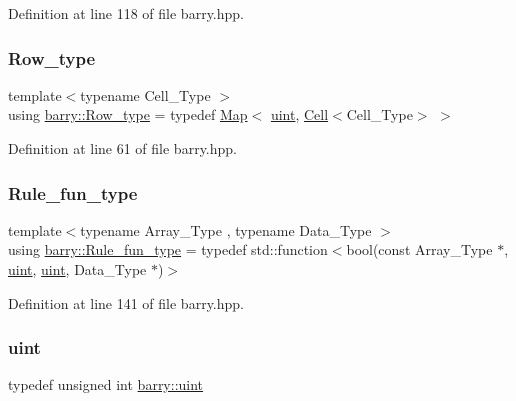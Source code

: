 Definition at line 118 of file barry.\+hpp.

\mbox{\label{namespacebarry_a741876d7060484e80a9f2b9d128d2c8d}} 
\subsubsection{\texorpdfstring{Row\+\_\+type}{Row\_type}}
{\footnotesize\ttfamily template$<$typename Cell\+\_\+\+Type $>$ \\
using \hyperlink{namespacebarry_a741876d7060484e80a9f2b9d128d2c8d}{barry\+::\+Row\+\_\+type} = typedef \hyperlink{namespacebarry_a979a04835a9855ff2054c383c569c89e}{Map}$<$ \hyperlink{namespacebarry_a11dfc53ddb4672278319aa04f1e09a6c}{uint}, \hyperlink{classbarry_1_1_cell}{Cell}$<$Cell\+\_\+\+Type$>$ $>$}



Definition at line 61 of file barry.\+hpp.

\mbox{\label{namespacebarry_aefd7e6d4ba228e2ce1074d075c512178}} 
\subsubsection{\texorpdfstring{Rule\+\_\+fun\+\_\+type}{Rule\_fun\_type}}
{\footnotesize\ttfamily template$<$typename Array\+\_\+\+Type , typename Data\+\_\+\+Type $>$ \\
using \hyperlink{namespacebarry_aefd7e6d4ba228e2ce1074d075c512178}{barry\+::\+Rule\+\_\+fun\+\_\+type} = typedef std\+::function$<$bool(const Array\+\_\+\+Type $\ast$, \hyperlink{namespacebarry_a11dfc53ddb4672278319aa04f1e09a6c}{uint}, \hyperlink{namespacebarry_a11dfc53ddb4672278319aa04f1e09a6c}{uint}, Data\+\_\+\+Type $\ast$)$>$}



Definition at line 141 of file barry.\+hpp.

\mbox{\label{namespacebarry_a11dfc53ddb4672278319aa04f1e09a6c}} 
\subsubsection{\texorpdfstring{uint}{uint}}
{\footnotesize\ttfamily typedef unsigned int \hyperlink{namespacebarry_a11dfc53ddb4672278319aa04f1e09a6c}{barry\+::uint}}




